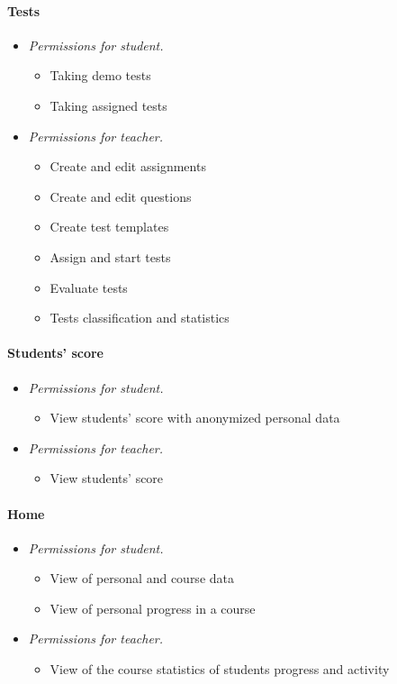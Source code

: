 \paragraph*{Tests} 
\begin{itemize}
    \item \emph{Permissions for student.}
    \begin{itemize}
        \item Taking demo tests
        \item Taking assigned tests
    \end{itemize}
    \item \emph{Permissions for teacher.}
    \begin{itemize}
        \item Create and edit assignments
        \item Create and edit questions
        \item Create test templates
        \item Assign and start tests
        \item Evaluate tests
        \item Tests classification and statistics
    \end{itemize}
\end{itemize}

\paragraph*{Students' score}
\begin{itemize}
    \item \emph{Permissions for student.}
    \begin{itemize}
        \item View students' score with anonymized personal data
    \end{itemize}
    \item \emph{Permissions for teacher.}
    \begin{itemize}
        \item View students' score
    \end{itemize}
\end{itemize}

\paragraph*{Home}
\begin{itemize}
    \item \emph{Permissions for student.} 
        \begin{itemize}
        \item View of personal and course data
        \item View of personal progress in a course
    \end{itemize}
    \item \emph{Permissions for teacher.}
        \begin{itemize}
        \item View of the course statistics of students progress and activity
    \end{itemize}
\end{itemize}

